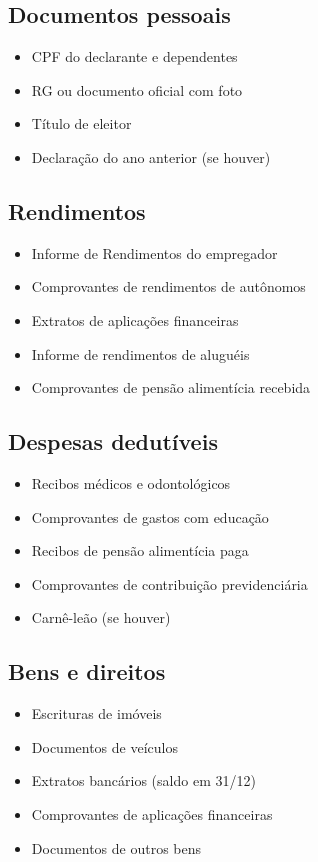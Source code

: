 \documentclass[12pt,a4paper]{article}
\begin{document}
\subsection{Documentos pessoais}
\begin{itemize}
    \item CPF do declarante e dependentes
    \item RG ou documento oficial com foto
    \item Título de eleitor
    \item Declaração do ano anterior (se houver)
\end{itemize}

\subsection{Rendimentos}
\begin{itemize}
    \item Informe de Rendimentos do empregador
    \item Comprovantes de rendimentos de autônomos
    \item Extratos de aplicações financeiras
    \item Informe de rendimentos de aluguéis
    \item Comprovantes de pensão alimentícia recebida
\end{itemize}

\subsection{Despesas dedutíveis}
\begin{itemize}
    \item Recibos médicos e odontológicos
    \item Comprovantes de gastos com educação
    \item Recibos de pensão alimentícia paga
    \item Comprovantes de contribuição previdenciária
    \item Carnê-leão (se houver)
\end{itemize}

\subsection{Bens e direitos}
\begin{itemize}
    \item Escrituras de imóveis
    \item Documentos de veículos
    \item Extratos bancários (saldo em 31/12)
    \item Comprovantes de aplicações financeiras
    \item Documentos de outros bens
\end{itemize}
\end{document}
